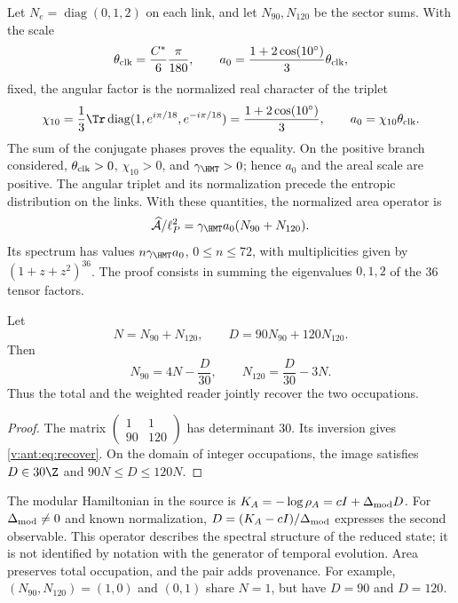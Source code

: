 Let $N_e=\operatorname{diag}(0,1,2)$ on each link, and let
$N_{90},N_{120}$ be the sector sums. With the scale
\[
\theta_{\rm clk}=\frac{C^*}{6}\frac{\pi}{180},\qquad
a_0=\frac{1+2\cos(10^\circ)}3\theta_{\rm clk},
\]
fixed, the angular factor is the normalized real character of the triplet
\begin{equation}
 \chi_{10}=\frac13\Tr\operatorname{diag}
       (1,e^{i\pi/18},e^{-i\pi/18})
 =\frac{1+2\cos(10^\circ)}3,
 \qquad a_0=\chi_{10}\theta_{\rm clk}.
 \label{v:ant:eq:ii-area-caracter-triplete}
\end{equation}
The sum of the conjugate phases proves the equality. On the positive branch
considered, \(\theta_{\rm clk}>0\), \(\chi_{10}>0\), and
\(\gamma_{\HMT}>0\); hence \(a_0\) and the areal scale are
positive. The angular triplet and its normalization precede the
entropic distribution on the links. With these quantities,
the normalized area operator is
\[
\widehat{\mathcal A}/\ell_P^2
=\gamma_{\HMT}a_0(N_{90}+N_{120}).
\]
Its spectrum has values $n\gamma_{\HMT}a_0$, $0\le n\le72$,
with multiplicities given by $(1+z+z^2)^{36}$.
The proof consists in summing the eigenvalues $0,1,2$ of the
36 tensor factors.

\begin{theorem}
Let
\[
N=N_{90}+N_{120},\qquad D=90N_{90}+120N_{120}.
\]
Then
\begin{equation}
N_{90}=4N-\frac D{30},\qquad
N_{120}=\frac D{30}-3N.
\label{v:ant:eq:recover}
\end{equation}
Thus the total and the weighted reader jointly recover
the two occupations.
\end{theorem}
\begin{proof}
The matrix $\left(\begin{smallmatrix}1&1\\90&120\end{smallmatrix}\right)$
has determinant $30$. Its inversion gives \eqref{v:ant:eq:recover}.
On the domain of integer occupations, the image satisfies
$D\in30\Z$ and $90N\le D\le120N$.
\end{proof}

The modular Hamiltonian in the source is
$K_A=-\log\rho_A=cI+\Delta_{\rm mod}D$.
For $\Delta_{\rm mod}\ne0$ and known normalization,
$D=(K_A-cI)/\Delta_{\rm mod}$ expresses the second observable.
This operator describes the spectral structure of the reduced state;
it is not identified by notation with the generator of temporal evolution.
Area preserves total occupation, and the pair adds provenance.
For example, $(N_{90},N_{120})=(1,0)$ and $(0,1)$ share $N=1$,
but have $D=90$ and $D=120$.

